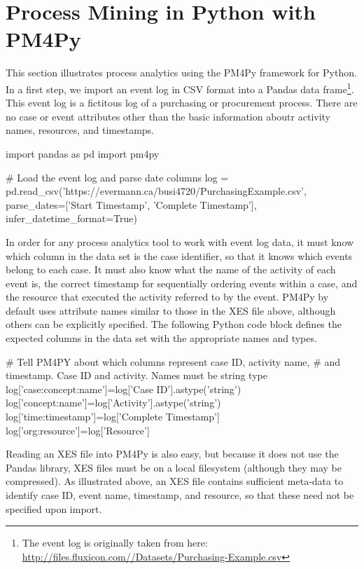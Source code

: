 \section{Process Mining in Python with PM4Py}

This section illustrates process analytics using the PM4Py framework for Python. In a first step, we import an event log in CSV format into a Pandas data frame\footnote{The event log is originally taken from here: \url{http://files.fluxicon.com//Datasets/Purchasing-Example.csv}}. This event log is a fictitous log of a purchasing or procurement process. There are no case or event attributes other than the basic information aboutr activity names, resources, and timestamps.

\begin{pythoncode}
import pandas as pd
import pm4py

# Load the event log and parse date columns
log = pd.read_csv('https://evermann.ca/busi4720/PurchasingExample.csv', 
   parse_dates=['Start Timestamp', 'Complete Timestamp'], 
   infer_datetime_format=True)
\end{pythoncode}

In order for any process analytics tool to work with event log data, it must know which column in the data set is the case identifier, so that it knows which events belong to each case. It must also know what the name of the activity of each event is, the correct timestamp for sequentially ordering events within a case, and the resource that executed the activity referred to by the event. PM4Py by default uses attribute names similar to those in the XES file above, although others can be explicitly specified. The following Python code block defines the expected columns in the data set with the appropriate names and types.

\begin{pythoncode}
# Tell PM4PY about which columns represent case ID, activity name, 
# and timestamp. Case ID and activity. Names must be string type
log['case:concept:name']=log['Case ID'].astype('string')
log['concept:name']=log['Activity'].astype('string')
log['time:timestamp']=log['Complete Timestamp']
log['org:resource']=log['Resource']
\end{pythoncode}

Reading an XES file into PM4Py is also easy, but because it does not use the Pandas library, XES files must be on a local filesystem (although they may be compressed). As illustrated above, an XES file contains sufficient meta-data to identify case ID, event name, timestamp, and resource, so that these need not be specified upon import.

